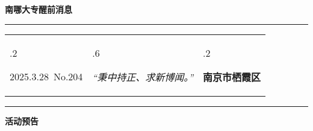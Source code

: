 \documentclass[letterpaper, 12pt]{article}
\begin{document}
\begin{center}
    \Huge\textbf{南哪大专醒前消息}
\end{center}
\vspace{4mm}
\hrule
\renewcommand\tabularxcolumn[1]{m{#1}}
\begin{tabularx}{\textwidth}{>{\hsize.2\hsize}X>{\hsize.6\hsize}X>{\hsize.2\hsize}X}
    \begin{flushleft}
        2025.3.28\, No.204
    \end{flushleft}
    &
    \begin{center}
        \textit{“秉中持正、求新博闻。”}
    \end{center}
    &
    \begin{flushright}
        \textbf{南京市栖霞区}
    \end{flushright}
\end{tabularx}
\vspace{-3.5mm}
\hrule
\vspace{4mm}
\centerline{\huge\textbf{活动预告}}
\end{document}

